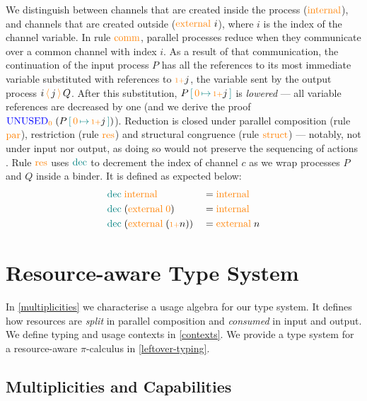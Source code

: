 \documentclass[runningheads]{llncs}
\newcommand{\picalc}{$\pi$-calculus}
\newcommand{\type}[1]{\textcolor{blue}{\operatorname{#1}}}
\newcommand{\constr}[1]{\textcolor{orange}{\operatorname{#1}}}
\newcommand{\func}[1]{\textcolor{teal}{\operatorname{#1}}}
\newcommand{\send}[2]{#1 \, \constr{\langle} \, #2 \,\constr{\rangle} \,}
\newcommand{\suc}{\constr{\scriptstyle 1+}}
\newcommand{\subst}[3]{#1 \, \func{[} \, #3 \, \func{\mapsto} \,#2 \, \func{]}}
\newcommand{\Unused}{\type{UNUSED}}
\begin{document}
\begin{nidefinition}
We distinguish between channels that are created inside the process ($\constr{internal}$), and channels that are created outside ($\constr{external}\ i$), where $i$ is the index of the channel variable.
In rule $\constr{comm}$, parallel processes reduce when they communicate over a common channel with index ${i}$.
As a result of that communication, the continuation of the input process $P$ has all the references to its most immediate variable substituted with references to $\suc j$, the variable sent by the output process $\send{i}{j}{Q}$.
After this substitution, $\subst{P}{\suc j}{\constr{0}}$ is \emph{lowered} --- all variable references are decreased by one (and we derive the proof $\Unused_{\constr{0}} \; (\subst{P}{\suc j}{\constr{0}})$).
Reduction is closed under parallel composition (rule $\constr{par}$), restriction (rule $\constr{res}$) and structural congruence (rule $\constr{struct}$) 
--- notably, not under input nor output, as doing so would not preserve the sequencing of actions \cite{Sangio01}.
Rule $\constr{res}$ uses $\func{dec}$ to decrement the index of channel $c$ as we wrap processes $P$ and $Q$ inside a binder.
It is defined as expected below:
\begin{equation*}
  \begin{aligned}
    & \func{dec} \; \constr{internal}                 && = \constr{internal} \\
    & \func{dec} \; (\constr{external} \; \constr{0}) && = \constr{internal} \\
    & \func{dec} \; (\constr{external} \; (\suc n))   && = \constr{external} \; n \\
  \end{aligned}
\end{equation*}
\end{nidefinition}

\section{Resource-aware Type System}
\label{type-system}

In \autoref{multiplicities} we characterise a usage algebra for our type system.
It defines how resources are \emph{split} in parallel composition and \emph{consumed} in input and output.
We define typing and usage contexts in \autoref{contexts}.
We provide a type system for a resource-aware \picalc{} in \autoref{leftover-typing}.

\subsection{Multiplicities and Capabilities}
\label{multiplicities}
\end{document}
